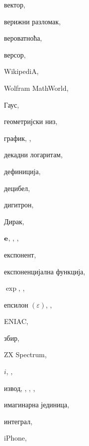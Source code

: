 \begin{theindex}
  \indexspace

  \item вектор, 
  \item верижни разломак, 
  \item вероватноћа, 
  \item версор, 
  \interskip
  \item {\sc  WikipediA}, 
  \item Wolfram MathWorld, 

  \indexspace

  \item Гаус, 
  \item геометријски низ, 
  \item график, , 

  \indexspace

  \item декадни логаритам, 
  \item дефиниција, 
  \item децибел, 
  \item дигитрон, 
  \item Дирак, 

  \indexspace

  \item ${\bf e}$, , , 
  \item експонент, 
  \item експоненцијална функција, 
  \item $\exp$, , 
  \item епсилон $(\varepsilon)$, , 
  \interskip
  \item ENIAC, 

  \indexspace

  \item збир, 
  \interskip
  \item \textsf{ZX Spectrum}, 

  \indexspace

  \item $i$, , 
  \item извод, , , , 
  \item имагинарна јединица, 
  \item интеграл, 
  \interskip
  \item iPhone, 


\end{theindex}
